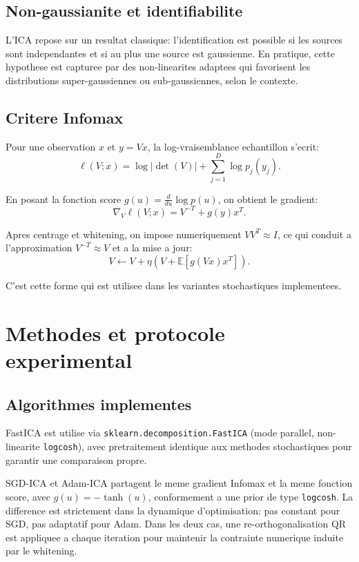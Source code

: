 \documentclass[11pt,a4paper]{article}
\begin{document}
\subsection{Non-gaussianite et identifiabilite}

L'ICA repose sur un resultat classique: l'identification est possible si les sources sont independantes et si au plus une source est gaussienne. En pratique, cette hypothese est capturee par des non-linearites adaptees qui favorisent les distributions super-gaussiennes ou sub-gaussiennes, selon le contexte.

\subsection{Critere Infomax}

Pour une observation $x$ et $y=Vx$, la log-vraisemblance echantillon s'ecrit:
\begin{equation}
\ell(V;x)=\log|\det(V)|+\sum_{j=1}^{D}\log p_j(y_j).
\end{equation}

En posant la fonction score $g(u)=\frac{d}{du}\log p(u)$, on obtient le gradient:
\begin{equation}
\nabla_V\ell(V;x)=V^{-T}+g(y)x^T.
\end{equation}

Apres centrage et whitening, on impose numeriquement $VV^T \approx I$, ce qui conduit a l'approximation $V^{-T}\approx V$ et a la mise a jour:
\begin{equation}
V \leftarrow V + \eta\left(V+\mathbb{E}[g(Vx)x^T]\right).
\end{equation}

C'est cette forme qui est utilisee dans les variantes stochastiques implementees.

\section{Methodes et protocole experimental}

\subsection{Algorithmes implementes}

FastICA est utilise via \texttt{sklearn.decomposition.FastICA} (mode parallel, non-linearite \texttt{logcosh}), avec pretraitement identique aux methodes stochastiques pour garantir une comparaison propre.

SGD-ICA et Adam-ICA partagent le meme gradient Infomax et la meme fonction score, avec $g(u)=-\tanh(u)$, conformement a une prior de type \texttt{logcosh}. La difference est strictement dans la dynamique d'optimisation: pas constant pour SGD, pas adaptatif pour Adam. Dans les deux cas, une re-orthogonalisation QR est appliquee a chaque iteration pour maintenir la contrainte numerique induite par le whitening.
\end{document}
